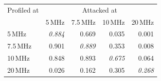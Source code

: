 \begin{tabular}{lrrrr}
\hline
Profiled at & \multicolumn{4}{c}{Attacked at} \\
 & 5\,MHz & 7.5\,MHz & 10\,MHz & 20\,MHz \\
\hline
5\,MHz & \textit{0.884} & 0.669 & 0.035 & 0.001 \\
7.5\,MHz & 0.901 & \textit{0.889} & 0.353 & 0.008 \\
10\,MHz & 0.848 & 0.893 & \textit{0.675} & 0.064 \\
20\,MHz & 0.026 & 0.162 & 0.305 & \textit{0.268} \\
\hline
\end{tabular}
